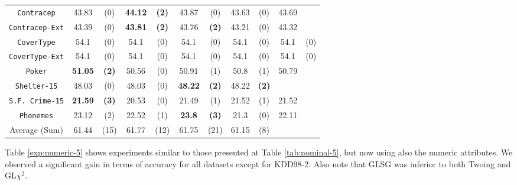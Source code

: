 \begin{table*}
\begin{tabular}{c|cc|cc|cc|cc|cc}
{\tt Contracep}    &43.83       & (0)       & {\bf 44.12} & {\bf (2)} & 43.87       & (0)       & 43.63       & (0)       & 43.69       &           \\
{\tt Contracep-Ext}&43.39       & (0)       & {\bf 43.81} & {\bf (2)} & 43.76       & {\bf (2)} & 43.21       & (0)       & 43.32       &           \\
{\tt CoverType}    &54.1        & (0)       & 54.1        & (0)       & 54.1        & (0)       & 54.1        & (0)       & 54.1        & (0)       \\
{\tt CoverType-Ext}&54.1        & (0)       & 54.1        & (0)       & 54.1        & (0)       & 54.1        & (0)       & 54.1        & (0)       \\
{\tt Poker}        &{\bf 51.05} & {\bf (2)} & 50.56       & (0)       & 50.91       & (1)       & 50.8        & (1)       & 50.79       &           \\  
{\tt Shelter-15}   & 48.03      & (0)       & 48.03       & (0)       & {\bf 48.22} & {\bf (2)} & 48.22       & {\bf (2)} &             &           \\   
{\tt S.F. Crime-15}&{\bf 21.59} & {\bf (3)} & 20.53       & (0)       & 21.49       & (1)       & 21.52       & (1)       & 21.52       &           \\ 
{\tt Phonemes}     & 23.12      & (2)       & 22.52       & (1)       & {\bf 23.8 } & {\bf (3)} & 21.3        & (0)       & 22.11       &           \\ 
\hline
Average (Sum)      & 61.44      & (15)      & 61.77       & (12)      & 61.75       & (21)      & 61.15       & (8)       &             &    
       \end{tabular}
\end{table*}


Table \ref{exp:numeric-5} shows experiments  similar to those presented at Table \ref{tab:nominal-5}, but now
using also the numeric attributes. We observed a significant gain in terms of accuracy for all datasets except for KDD98-2. 
Also note that GLSG was inferior to both Twoing and GL$\chi^2$.

